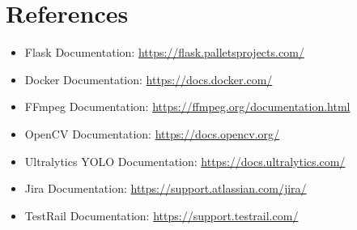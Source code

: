 \documentclass[12pt]{article}
\begin{document}
\newpage

\section{References}

\begin{itemize}[noitemsep]
    \item Flask Documentation: \url{https://flask.palletsprojects.com/}
    \item Docker Documentation: \url{https://docs.docker.com/}
    \item FFmpeg Documentation: \url{https://ffmpeg.org/documentation.html}
    \item OpenCV Documentation: \url{https://docs.opencv.org/}
    \item Ultralytics YOLO Documentation: \url{https://docs.ultralytics.com/}
    \item Jira Documentation: \url{https://support.atlassian.com/jira/}
    \item TestRail Documentation: \url{https://support.testrail.com/}
\end{itemize}
\end{document}
